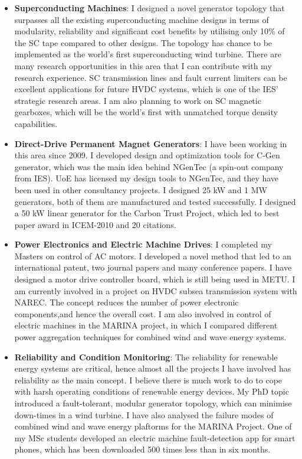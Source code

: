 \documentclass[a4paper,12pt]{article}
\begin{document}
\begin{itemize}
\item \textbf{Superconducting Machines}: I designed a novel generator topology that surpasses all the existing superconducting machine designs in terms of modularity, reliability and significant cost benefits by utilising only 10\% of the SC tape compared to other designs. The topology has chance to be implemented as the world's first superconducting wind turbine. There are many research opportunities in this area that I can contribute with my research experience. SC transmission lines and fault current limiters can be excellent applications for future HVDC systems, which is one of the IES' strategic research areas. I am also planning to work on SC magnetic gearboxes, which will be the world’s first with unmatched torque density capabilities.

\item \textbf{Direct-Drive Permanent Magnet Generators}: I have been working in this area since 2009. I developed design and optimization tools for C-Gen generator, which was the main idea behind NGenTec (a spin-out company from IES). UoE has licensed my design tools  to NGenTec, and they have been used in other consultancy projects. I designed 25 kW and 1 MW generators, both of them are manufactured and tested successfully. I designed a 50 kW linear generator for the Carbon Trust Project, which led to best paper award in ICEM-2010 and 20 citations.

\item \textbf{Power Electronics and Electric Machine Drives}: I completed my Masters on control of AC motors. I developed a novel method that led to an international patent, two journal papers and many conference papers. I have designed a motor drive controller board, which is still being used in METU. I am currently involved in a project on HVDC subsea transmission system with NAREC. The concept reduces the number of power electronic components,and hence the overall cost. I am also involved in control of electric machines in the MARINA project, in which I compared different power aggregation techniques for combined wind and wave energy systems.

\item \textbf{Reliability and Condition Monitoring}: The reliability for renewable energy systems are critical, hence almost all the projects I have involved has reliability as the main concept. I believe there is much work to do to cope with harsh operating conditions of renewable energy devices. My PhD topic introduced a fault-tolerant, modular generator topology, which can minimise down-times in a wind turbine. I have also analysed the failure modes of combined wind and wave energy plaftorms for the MARINA Project. One of my MSc students developed an electric machine fault-detection app for smart phones, which has been downloaded 500 times less than in six months.
\end{itemize}
\end{document}
